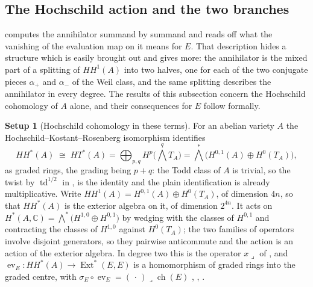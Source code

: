 \documentclass[11pt,reqno]{amsart}
\theoremstyle{plain}
\theoremstyle{definition}
\newtheorem{setupenv}[theorem]{Setup}
\theoremstyle{remark}
\newcommand{\CC}{\mathbb{C}}
\DeclareMathOperator{\ch}{ch}
\DeclareMathOperator{\td}{td}
\DeclareMathOperator{\Ext}{Ext}
\begin{document}
\subsection{The Hochschild action and the two branches}

 computes the annihilator summand by summand and reads off
what the vanishing of the evaluation map on it means for $E$. That
description hides a structure which is easily brought out and gives more:
the annihilator is the mixed part of a splitting of $HH^{1}(A)$ into two
halves, one for each of the two conjugate pieces $\alpha_{+}$ and
$\alpha_{-}$ of the Weil class, and the same splitting describes the
annihilator in every degree. The results of this subsection concern the
Hochschild cohomology of $A$ alone, and their consequences for $E$ follow
formally.

\begin{setupenv}[Hochschild cohomology in these terms]\label{setup:hh}
For an abelian variety $A$ the Hoch\-schild--Kostant--Rosen\-berg isomorphism
identifies
\[
  HH^{*}(A)\;\cong\;HT^{*}(A)=\bigoplus_{p,q}H^{p}\bigl(\textstyle\bigwedge^{q}T_{A}\bigr)
  =\textstyle\bigwedge^{*}\bigl(H^{0,1}(A)\oplus H^{0}(T_{A})\bigr),
\]
as graded rings, the grading being $p+q$: the Todd class of $A$ is trivial,
so the twist by $\td^{1/2}$ in \cite{Cal05}, \cite{CRV12} is the identity and
the plain identification is already multiplicative. Write
$HH^{1}(A)=H^{0,1}(A)\oplus H^{0}(T_{A})$, of dimension $4n$, so that
$HH^{*}(A)$ is the exterior algebra on it, of dimension $2^{4n}$. It acts on
$H^{*}(A,\CC)=\bigwedge^{*}\bigl(H^{1,0}\oplus H^{0,1}\bigr)$ by wedging with
the classes of $H^{0,1}$ and contracting the classes of $H^{1,0}$ against
$H^{0}(T_{A})$; the two families of operators involve disjoint generators, so
they pairwise anticommute and the action is an action of the exterior algebra.
In degree two this is the operator $x\lrcorner$ of , and
$\operatorname{ev}_{E}\colon HH^{*}(A)\to\Ext^{*}(E,E)$ is a homomorphism of
graded rings into the graded centre, with
$\sigma_{E}\circ\operatorname{ev}_{E}=(\,\cdot\,)\lrcorner\ch(E)$
\cite[Section 6]{BF08}, \cite{Cal05}, \cite{CRV12}.
\end{setupenv}
\end{document}

